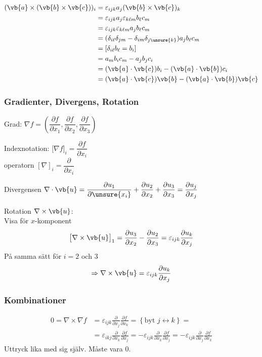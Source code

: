 \begin{align*}
(\vb{a} \times (\vb{b} \times \vb{c}))_i &= \varepsilon_{ijk} a_j (\vb{b} \times \vb{c})_k \\
&= \varepsilon_{ijk} a_j \varepsilon_{k\ell m} b_\ell c_m \\
&= \varepsilon_{ijk} \varepsilon_{k\ell m} a_j b_\ell c_m \\
&= (\delta_{i\ell}\delta_{jm} - \delta_{im}\delta_{j\unsure{k}}) a_j b_\ell c_m \\
&= [\delta_{i\ell} b_\ell = b_i] \\
&= a_m b_i c_m - a_j b_j c_i \\
&= (\vb{a} \cdot \vb{c}) b_i - (\vb{a} \cdot \vb{b}) c_i \\
&= (\vb{a} \cdot \vb{c}) \vb{b} - (\vb{a} \cdot \vb{b}) \vb{c}
\end{align*}

\subsubsection*{Gradienter, Divergens, Rotation}
Grad: $\nabla f = \left( \dfrac{\partial f}{\partial x_1}, \dfrac{\partial f}{\partial x_2}, \dfrac{\partial f}{\partial x_3} \right)$

Indexnotation: $\big[ \nabla f \big]_i = \dfrac{\partial f}{\partial x_i}$\\
\quad operatorn $[\nabla]_i = \dfrac{\partial}{\partial x_i}$

Divergensen $\nabla \cdot \vb{u} = \dfrac{\partial u_1}{\partial \unsure{x_i}} + \dfrac{\partial u_2}{\partial x_2} + \dfrac{\partial u_3}{\partial x_3} = \dfrac{\partial u_j}{\partial x_j}$

Rotation $\nabla \times \vb{u}$:\\
Visa för $x$-komponent
\[ \big[ \nabla \times \vb{u} \big]_1 = \frac{\partial u_3}{\partial x_2} - \frac{\partial u_2}{\partial x_3} = \varepsilon_{ijk} \frac{\partial u_k}{\partial x_j} \]
På samma sätt för $i = 2$ och $3$
\[ \Rightarrow \nabla \times \vb{u} = \varepsilon_{ijk} \frac{\partial u_k}{\partial x_j} \]

\subsubsection*{Kombinationer}
\begin{align*}
0 = \nabla \times \nabla f &= \varepsilon_{ijk} \frac{\partial}{\partial x_j} \frac{\partial f}{\partial x_k} = \left\{ \text{byt } j \leftrightarrow k \right\} = \\
&= \varepsilon_{ikj} \frac{\partial}{\partial x_k} \frac{\partial f}{\partial x_j} = -\varepsilon_{ijk} \frac{\partial}{\partial x_k} \frac{\partial f}{\partial x_j} = -\varepsilon_{ijk} \frac{\partial}{\partial x_j} \frac{\partial f}{\partial x_k}
\end{align*}
Uttryck lika med sig själv. Måste vara 0.
